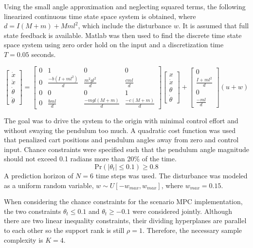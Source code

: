 \documentclass[12 pt]{report}
\begin{document}
Using the small angle approximation and neglecting squared terms, the following linearized continuous time state space system is obtained, where $d = I(M+m) + Mml^2$, which include the disturbance $w$. It is assumed that full state feedback is available. Matlab was then used to find the discrete time state space system using zero order hold on the input and a discretization time $T = 0.05$ seconds.

\begin{equation*}
\begin{bmatrix}
\dot{x} \\ \ddot{x} \\ \dot{\theta} \\ \ddot{\theta}
\end{bmatrix} = 
\begin{bmatrix}
0 & 1 & 0 & 0 \\
0 & \frac{-b(I + ml^2)}{d} & \frac{m^2gl^2}{d} & \frac{cml}{d} \\
0 & 0 & 0 & 1 \\
0 & \frac{bml}{d} & \frac{-mgl(M+m)}{d} & \frac{-c(M+m)}{d}
\end{bmatrix}
\begin{bmatrix}
x \\ \dot{x} \\ \theta \\ \dot{\theta}
\end{bmatrix} + 
\begin{bmatrix}
0 \\ \frac{I+ml^2}{d} \\ 0 \\ \frac{-ml}{d}
\end{bmatrix} (u + w)
\end{equation*}

The goal was to drive the system to the origin with minimal control effort and without swaying the pendulum too much. A quadratic cost function was used that penalized cart positions and pendulum angles away from zero and control input. Chance constraints were specified such that the pendulum angle magnitude should not exceed 0.1 radians more than 20\% of the time. $$ \mathrm{Pr}(|\theta_t| \leq 0.1) \geq 0.8$$ A prediction horizon of $N = 6$ time steps was used. The disturbance was modeled as a uniform random variable, $w \sim U[-w_{max}, w_{max}]$, where $w_{max} = 0.15$.

When considering the chance constraints for the scenario MPC implementation, the two constraints $\theta_t \leq 0.1$ and $\theta_t \geq -0.1$ were considered jointly. Although there are two linear inequality constraints, their dividing hyperplanes are parallel to each other so the support rank is still $\rho = 1$. Therefore, the necessary sample complexity is $K = 4$.
\end{document}
